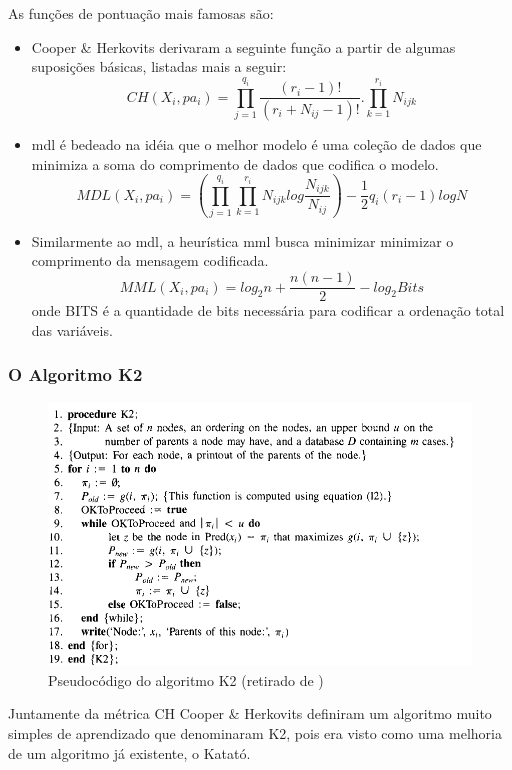 As funções de pontuação mais famosas são:
\begin{itemize}
	\item Cooper \& Herkovits \cite{cooper92} derivaram a seguinte função a partir de algumas suposições básicas, listadas mais a seguir:
	\begin{equation}
	CH(X_i, pa_i) = \prod_{j=1}^{q_i}\frac{(r_i - 1)!}{(r_i + N_{ij} - 1)!}.\prod_{k=1}^{r_i}N_{ijk}
	\end{equation}

	\item \gls{mdl} é bedeado na idéia que o melhor modelo é uma coleção de dados que minimiza a soma do comprimento de dados que codifica o modelo.
	\begin{equation}
	MDL(X_i,pa_i) = (\prod_{j=1}^{q_i}\prod_{k=1}^{r_i}N_{ijk}log\frac{N_{ijk}}{N_{ij}})-\frac{1}{2}q_i(r_i-1)logN
	\end{equation}

	\item Similarmente ao \gls{mdl}, a heurística \gls{mml} busca minimizar minimizar o comprimento da mensagem codificada.
	\begin{equation}
	MML(X_i,pa_i) = log_2 n + \frac{n(n-1)}{2}-log_2Bits
	\end{equation}
	onde BITS é a quantidade de bits necessária para codificar a ordenação total das variáveis.
\end{itemize}

\subsubsection{O Algoritmo K2}
\begin{figure}[htb]
	\centering
	\includegraphics[width = 450px]{figuras/K2}
	\caption{Pseudocódigo do algoritmo K2 (retirado de \cite{cooper92})}
	\label{fig:K2}
\end{figure}
Juntamente da métrica CH Cooper \& Herkovits \cite{cooper92} definiram um algoritmo muito simples de aprendizado que denominaram K2, pois era visto como uma melhoria de um algoritmo já existente, o Katató.

